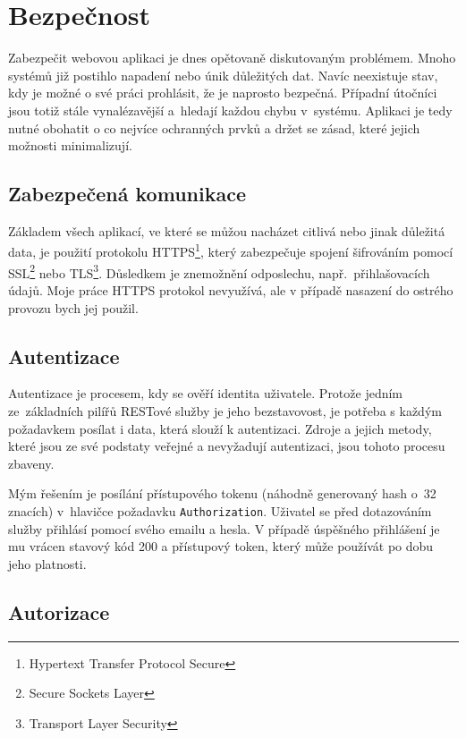 \section{Bezpečnost}
\label{sec:security}


Zabezpečit webovou aplikaci je dnes opětovaně diskutovaným problémem. Mnoho systémů již postihlo napadení
nebo únik důležitých dat. Navíc neexistuje stav, kdy je možné o své práci prohlásit, že je naprosto
bezpečná. Případní útočníci jsou totiž stále vynalézavější a~hledají každou chybu v~systému.
Aplikaci je tedy nutné obohatit o co nejvíce ochranných prvků a držet se zásad,
které jejich možnosti minimalizují.

\subsection{Zabezpečená komunikace}

Základem všech aplikací, ve které se můžou nacházet citlivá nebo jinak důležitá data,
je použití protokolu HTTPS\footnote{Hypertext Transfer Protocol Secure},
který zabezpečuje spojení šifrováním pomocí SSL\footnote{Secure Sockets Layer} nebo TLS\footnote{Transport Layer Security}.
Důsledkem je znemožnění odposlechu, např.~přihlašovacích údajů. Moje práce HTTPS protokol nevyužívá,
ale v případě nasazení do ostrého provozu bych jej použil.

\subsection{Autentizace}

Autentizace je procesem, kdy se ověří identita uživatele. Protože jedním ze~základních pilířů RESTové
služby je jeho bezstavovost, je potřeba s každým požadavkem posílat i data, která slouží k autentizaci.
Zdroje a jejich metody, které jsou ze své podstaty veřejné a nevyžadují autentizaci, jsou tohoto procesu zbaveny.

Mým řešením je posílání přístupového tokenu (náhodně generovaný hash o~32 znacích) v~hlavičce požadavku
\texttt{Authorization}. Uživatel se před dotazováním služby přihlásí pomocí svého emailu a hesla.
V případě úspěšného přihlášení je mu vrácen stavový kód 200 a přístupový token, který může používát po dobu jeho platnosti.

\subsection{Autorizace}


